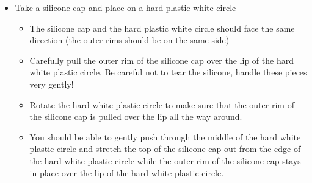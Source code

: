 \documentclass[
]{book}
\providecommand{\tightlist}{%
  \setlength{\itemsep}{0pt}\setlength{\parskip}{0pt}}
\begin{document}
\begin{itemize}
\tightlist
\item
  Take a silicone cap and place on a hard plastic white circle

  \begin{itemize}
  \tightlist
  \item
    The silicone cap and the hard plastic white circle should face the same direction (the outer rims should be on the same side)
  \item
    Carefully pull the outer rim of the silicone cap over the lip of the hard white plastic circle. Be careful not to tear the silicone, handle these pieces very gently!
  \item
    Rotate the hard white plastic circle to make sure that the outer rim of the silicone cap is pulled over the lip all the way around.
  \item
    You should be able to gently push through the middle of the hard white plastic circle and stretch the top of the silicone cap out from the edge of the hard white plastic circle while the outer rim of the silicone cap stays in place over the lip of the hard white plastic circle.
  \end{itemize}
\end{itemize}
\end{document}
